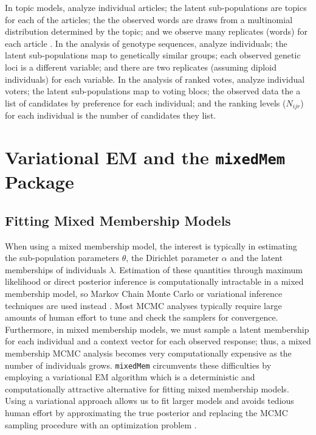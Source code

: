 \documentclass{article}
\begin{document}
In topic models, \cite{LDA, erosheva2004mixed} analyze individual articles; the latent sub-populations are topics for each of the articles; the the observed words are draws from a multinomial distribution determined by the topic; and we observe many replicates (words) for each article . In the analysis of genotype sequences, \cite{pritchard2000inference} analyze individuals; the latent sub-populations map to genetically similar groups; each observed genetic loci is a different variable; and there are two replicates (assuming diploid individuals) for each variable. In the analysis of ranked votes, \cite{gormley2009grade} analyze individual voters; the latent sub-populations map to voting blocs; the observed data the a list of candidates by preference for each individual; and the ranking levels ($N_{ijr}$) for each individual is the number of candidates they list.     

\section{Variational EM and the \texttt{mixedMem} Package}\label{variational}

\subsection{Fitting Mixed Membership Models}
When using a mixed membership model, the interest is typically in estimating the sub-population parameters $\theta$, the Dirichlet parameter $\alpha$ and the latent memberships of individuals $\lambda$. Estimation of these quantities through maximum likelihood or direct posterior inference is computationally intractable in a mixed membership model, so Markov Chain Monte Carlo or variational inference techniques are used instead \citep{airoldi2009mixed}. Most MCMC analyses typically require large amounts of human effort to tune and check the samplers for convergence. Furthermore, in mixed membership models, we must sample a latent membership for each individual and a context vector for each observed response; thus, a mixed membership MCMC analysis becomes very computationally expensive as the number of individuals grows. \texttt{mixedMem} circumvents these difficulties by employing a variational EM algorithm which is a deterministic and computationally attractive alternative for fitting mixed membership models. Using a variational approach allows us to fit larger models and avoids tedious human effort by approximating the true posterior and replacing the MCMC sampling procedure with an optimization problem \citep{beal2003variational}.  
\end{document}

